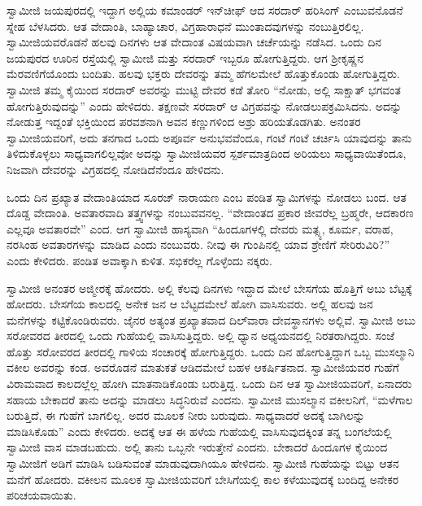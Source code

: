  ಸ್ವಾಮೀಜಿ ಜಯಪುರದಲ್ಲಿ ಇದ್ದಾಗ ಅಲ್ಲಿಯ ಕಮಾಂಡರ್ ಇನ್‍ಚೀಫ್ ಆದ ಸರದಾರ್ ಹರಿಸಿಂಗ್ ಎಂಬುವನೊಡನೆ ಸ್ನೇಹ ಬೆಳಸಿದರು. ಆತ ವೇದಾಂತಿ, ಬಾಹ್ಯಾಚಾರ, ವಿಗ್ರಹಾರಾಧನೆ ಮುಂತಾದವುಗಳನ್ನು ನಂಬುತ್ತಿರಲಿಲ್ಲ. ಸ್ವಾಮೀಜಿಯವರೊಡನೆ ಹಲವು ದಿನಗಳು ಆತ ವೇದಾಂತ ವಿಷಯವಾಗಿ ಚರ್ಚೆಯನ್ನು ನಡೆಸಿದ. ಒಂದು ದಿನ ಜಯಪುರದ ಊರಿನ ರಸ್ತೆಯಲ್ಲಿ ಸ್ವಾಮೀಜಿ ಮತ್ತು ಸರದಾರ್ ಇಬ್ಬರೂ ಹೋಗುತ್ತಿದ್ದರು. ಆಗ ಶ‍್ರೀಕೃಷ್ಣನ ಮೆರವಣಿಗೆಯೊಂದು ಬಂದಿತು. ಹಲವು ಭಕ್ತರು ದೇವರನ್ನು ತಮ್ಮ ಹೆಗಲಮೇಲೆ ಹೊತ್ತುಕೊಂಡು ಹೋಗುತ್ತಿದ್ದರು. ಸ್ವಾಮೀಜಿ ತಮ್ಮ ಕೈಯಿಂದ ಸರದಾರ್ ಅವರನ್ನು ಮುಟ್ಟಿ ದೇವರ ಕಡೆ ತೋರಿ “ನೋಡು, ಅಲ್ಲಿ ಸಾಕ್ಷಾತ್ ಭಗವಂತ ಹೋಗುತ್ತಿರುವುದನ್ನು” ಎಂದು ಹೇಳಿದರು. ತಕ್ಷಣವೇ ಸರದಾರ್ ಆ ವಿಗ್ರಹವನ್ನು ನೋಡಲುಪಕ್ರಮಿಸಿದನು. ಅದನ್ನು ನೋಡುತ್ತ ಇದ್ದಂತೆ ಭಕ್ತಿಯಿಂದ ಪರವಶನಾಗಿ ಅವನ ಕಣ್ಣುಗಳಿಂದ ಅಶ್ರು ಹರಿಯತೊಡಗಿತು. ಅನಂತರ ಸ್ವಾಮೀಜಿಯವರಿಗೆ, ಅದು ತನಗಾದ ಒಂದು ಅಪೂರ್ವ ಅನುಭವವೆಂದೂ, ಗಂಟೆ ಗಂಟೆ ಚರ್ಚಿಸಿ ಯಾವುದನ್ನು ತಾನು ತಿಳಿದುಕೊಳ್ಳಲು ಸಾಧ್ಯವಾಗಲಿಲ್ಲವೋ ಅದನ್ನು ಸ್ವಾಮೀಜಿಯವರ ಸ್ಪರ್ಶಮಾತ್ರದಿಂದ ಅರಿಯಲು ಸಾಧ್ಯವಾಯಿತೆಂದೂ, ನಿಜವಾಗಿ ದೇವರನ್ನು ವಿಗ್ರಹದಲ್ಲಿ ನೋಡಿದೆನೆಂದೂ ಹೇಳಿದನು. 

 ಒಂದು ದಿನ ಪ್ರಖ್ಯಾತ ವೇದಾಂತಿಯಾದ ಸೂರಜ್ ನಾರಾಯಣ ಎಂಬ ಪಂಡಿತ ಸ್ವಾಮಿಗಳನ್ನು ನೋಡಲು ಬಂದ. ಆತ ದೊಡ್ದ ವೇದಾಂತಿ. ಅವತಾರವಾದಿ ತತ್ತ್ವಗಳನ್ನು ನಂಬುವವನಲ್ಲ. “ವೇದಾಂತದ ಪ್ರಕಾರ ಜೀವರೆಲ್ಲ ಬ್ರಹ್ಮರೇ, ಆದಕಾರಣ ಎಲ್ಲವೂ ಅವತಾರವೇ” ಎಂದ. ಆಗ ಸ್ವಾಮೀಜಿ ಹಾಸ್ಯವಾಗಿ “ಹಿಂದೂಗಳಲ್ಲಿ ದೇವರು ಮತ್ಸ್ಯ, ಕೂರ್ಮ, ವರಾಹ, ನರಸಿಂಹ ಅವತಾರಗಳನ್ನು ಮಾಡಿದ ಎಂದು ನಂಬುವರು. ನೀವು ಈ ಗುಂಪಿನಲ್ಲಿ ಯಾವ ಶ್ರೇಣಿಗೆ ಸೇರಿರುವಿರಿ?” ಎಂದು ಕೇಳಿದರು. ಪಂಡಿತ ಅವಾಕ್ಕಾಗಿ ಕುಳಿತ. ಸಭಿಕರೆಲ್ಲ ಗೊಳ್ಳೆಂದು ನಕ್ಕರು. 

 ಸ್ವಾಮೀಜಿ ಅನಂತರ ಅಜ್ಮೀರಕ್ಕೆ ಹೋದರು. ಅಲ್ಲಿ ಕೆಲವು ದಿನಗಳು ಇದ್ದಾದ ಮೇಲೆ ಬೇಸಗೆಯ ಹೊತ್ತಿಗೆ ಅಬು ಬೆಟ್ಟಕ್ಕೆ ಹೋದರು. ಬೇಸಗೆಯ ಕಾಲದಲ್ಲಿ ಅನೇಕ ಜನ ಆ ಬೆಟ್ಟದಮೇಲೆ ಹೋಗಿ ವಾಸಿಸುವರು. ಅಲ್ಲಿ ಹಲವು ಜನ ಮನೆಗಳನ್ನು ಕಟ್ಟಿಕೊಂಡಿರುವರು. ಜೈನರ ಅತ್ಯಂತ ಪ್ರಖ್ಯಾತವಾದ ದಿಲ್‍ವಾರಾ ದೇವಸ್ಥಾನಗಳು ಅಲ್ಲಿವೆ. ಸ್ವಾಮೀಜಿ ಅಬು ಸರೋವರದ ತೀರದಲ್ಲಿ ಒಂದು ಗುಹೆಯಲ್ಲಿ ವಾಸಿಸುತ್ತಿದ್ದರು. ಅಲ್ಲಿ ಧ್ಯಾನ ಅಧ್ಯಯನದಲ್ಲಿ ನಿರತರಾಗಿದ್ದರು. ಸಂಜೆ ಹೊತ್ತು ಸರೋವರದ ತೀರದಲ್ಲಿ ಗಾಳಿಯ ಸಂಚಾರಕ್ಕೆ ಹೋಗುತ್ತಿದ್ದರು. ಒಂದು ದಿನ ಹೋಗುತ್ತಿದ್ದಾಗ ಒಬ್ಬ ಮುಸಲ್ಮಾನಿ ವಕೀಲ ಅವರನ್ನು ಕಂಡ. ಅವರೊಡನೆ ಮಾತುಕತೆ ಆಡಿದಮೇಲೆ ಬಹಳ ಆಕರ್ಷಿತನಾದ. ಸ್ವಾಮೀಜಿಯವರ ಗುಹೆಗೆ ವಿರಾಮವಾದ ಕಾಲದಲ್ಲೆಲ್ಲ ಹೋಗಿ ಮಾತನಾಡಿಕೊಂಡು ಬರುತ್ತಿದ್ದ. ಒಂದು ದಿನ ಆತ ಸ್ವಾಮೀಜಿಯವರಿಗೆ, ಏನಾದರು ಸಹಾಯ ಬೇಕಾದರೆ ತಾನು ಅದನ್ನು ಮಾಡಲು ಸಿದ್ಧನಿರುವೆ ಎಂದನು. ಸ್ವಾಮೀಜಿ ಮುಸಲ್ಮಾನ ವಕೀಲನಿಗೆ, “ಮಳೆಗಾಲ ಬರುತ್ತಿದೆ, ಈ ಗುಹೆಗೆ ಬಾಗಲಿಲ್ಲ. ಅದರ ಮೂಲಕ ನೀರು ಬರುವುದು. ಸಾಧ್ಯವಾದರೆ ಅದಕ್ಕೆ ಬಾಗಿಲನ್ನು ಮಾಡಿಸಿಕೊಡು” ಎಂದು ಕೇಳಿದರು. ಅದಕ್ಕೆ ಆತ ಈ ಹಳೆಯ ಗುಹೆಯಲ್ಲಿ ವಾಸಿಸುವುದಕ್ಕಿಂತ ತನ್ನ ಬಂಗಲೆಯಲ್ಲಿ ಸ್ವಾಮೀಜಿ ವಾಸ ಮಾಡಬಹುದು. ಅಲ್ಲಿ ತಾನು ಒಬ್ಬನೇ ಇರುತ್ತೇನೆ ಎಂದನು. ಬೇಕಾದರೆ ಹಿಂದೂಗಳ ಕೈಯಿಂದ ಸ್ವಾಮೀಜಿಗೆ ಅಡಿಗೆ ಮಾಡಿಸಿ ಬಡಿಸುವಂತೆ ಮಾಡುವುದಾಗಿಯೂ ಹೇಳಿದನು. ಸ್ವಾಮೀಜಿ ಗುಹೆಯನ್ನು ಬಿಟ್ಟು ಆತನ ಮನೆಗೆ ಹೋದರು. ವಕೀಲನ ಮೂಲಕ ಸ್ವಾಮೀಜಿಯವರಿಗೆ ಬೇಸಿಗೆಯಲ್ಲಿ ಕಾಲ ಕಳೆಯುವುದಕ್ಕೆ ಬಂದಿದ್ದ ಅನೇಕರ ಪರಿಚಯವಾಯಿತು. 

